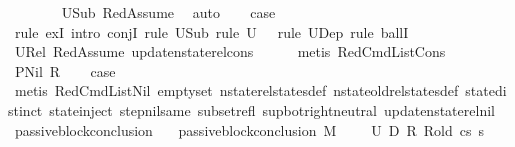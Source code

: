 \begin{isabellebody}
\ \ \ \ \ \ \isamarkupfalse%
\ U{}Sub\ RedAssume\ \isamarkupfalse%
\ auto\isanewline
\ \ \isamarkupfalse%
\ {\isacharquery}{\kern0pt}case\isanewline
\ \ \ \ \isamarkupfalse%
\ {\isacharparenleft}{\kern0pt}rule\ exI{\isacharcomma}{\kern0pt}\ intro\ conjI{\isacharcomma}{\kern0pt}\ rule\ U{}Sub{\isacharprime}{\kern0pt}{\isacharcomma}{\kern0pt}\ rule\ {\isacartoucheopen}U{}\ {\isasymnoteq}\ {\isacharbraceleft}{\kern0pt}{\isacharbraceright}{\kern0pt}{\isacartoucheclose}{\isacharcomma}{\kern0pt}\ rule\ U{}Dep{\isacharprime}{\kern0pt}{\isacharcomma}{\kern0pt}\ rule\ ballI{\isacharparenright}{\kern0pt}\isanewline
\ \ \ \ \isamarkupfalse%
\ U{}Rel\ RedAssume{}\ update{\isacharunderscore}{\kern0pt}nstate{\isacharunderscore}{\kern0pt}rel{\isacharunderscore}{\kern0pt}cons\isanewline
\ \ \ \ \isamarkupfalse%
\ {\isacharparenleft}{\kern0pt}metis\ RedCmdListCons{\isacharparenright}{\kern0pt}\isanewline
{}\isamarkupfalse%
\isanewline
\ \ \isamarkupfalse%
\ {\isacharparenleft}{\kern0pt}PNil\ R{\isacharparenright}{\kern0pt}\isanewline
\ \ \isamarkupfalse%
\ {\isacharquery}{\kern0pt}case\isanewline
\ \ \isamarkupfalse%
\ {\isacharparenleft}{\kern0pt}metis\ RedCmdListNil\ empty{\isacharunderscore}{\kern0pt}set\ nstate{\isacharunderscore}{\kern0pt}rel{\isacharunderscore}{\kern0pt}states{\isacharunderscore}{\kern0pt}def\ nstate{\isacharunderscore}{\kern0pt}old{\isacharunderscore}{\kern0pt}rel{\isacharunderscore}{\kern0pt}states{\isacharunderscore}{\kern0pt}def\ state{\isachardot}{\kern0pt}distinct{\isacharparenleft}{\kern0pt}{}{\isacharparenright}{\kern0pt}\ state{\isachardot}{\kern0pt}inject\ step{\isacharunderscore}{\kern0pt}nil{\isacharunderscore}{\kern0pt}same\ subset{\isacharunderscore}{\kern0pt}refl\ sup{\isacharunderscore}{\kern0pt}bot{\isachardot}{\kern0pt}right{\isacharunderscore}{\kern0pt}neutral\ update{\isacharunderscore}{\kern0pt}nstate{\isacharunderscore}{\kern0pt}rel{\isacharunderscore}{\kern0pt}nil{\isacharparenright}{\kern0pt}\isanewline
{}\isamarkupfalse%
%
\endisatagproof
{\isafoldproof}%
%
\isadelimproof
\isanewline
%
\endisadelimproof
\isanewline
{}\isamarkupfalse%
\ passive{\isacharunderscore}{\kern0pt}block{\isacharunderscore}{\kern0pt}conclusion\isanewline
\ \ \ {\isachardoublequoteopen}passive{\isacharunderscore}{\kern0pt}block{\isacharunderscore}{\kern0pt}conclusion\ M\ {\isasymLambda}\ {\isasymLambda}{\isacharprime}{\kern0pt}\ {\isasymGamma}\ {\isasymOmega}\ U{}\ D{}\ R\ R{\isacharunderscore}{\kern0pt}old\ cs{}\ s{\isacharprime}{\kern0pt}\ {\isacharequal}{\kern0pt}\ \isanewline

\end{isabellebody}
